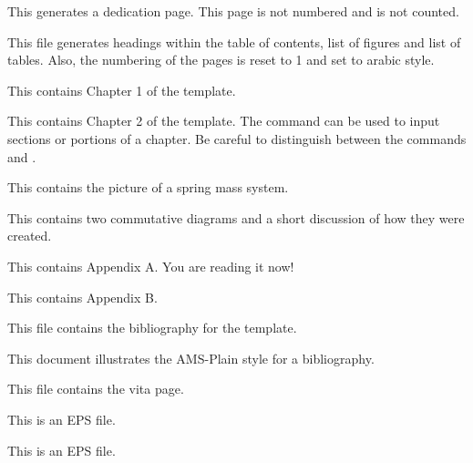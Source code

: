 \begin{enumerate}
This generates a dedication page.  
This page is not numbered and is not counted.


This file generates headings within the table of contents, list of figures
and list of tables.  Also, the numbering of the pages is reset to 1 and
set to arabic style.


This contains Chapter 1 of the template.  


This  contains  Chapter 2 of the template.  
The \verb++ command can be used to input 
sections or portions of a chapter.
Be careful to distinguish between the commands
\verb++ and \verb++.


This contains the picture of a spring mass system.


This contains two commutative diagrams and a 
short discussion of how they were created.


This contains Appendix A. You are reading it now!


This  contains Appendix B.  


This file contains the bibliography for the template.


This document illustrates the AMS-Plain style for a bibliography.


This file contains the vita page.



This is an EPS file.


This is an EPS file.

\end{enumerate}




\clearpage

\endinput

